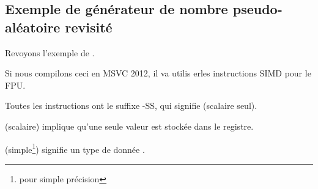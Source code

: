 \subsection{Exemple de générateur de nombre pseudo-aléatoire revisité}
\label{FPU_PRNG_SIMD}

Revoyons l'exemple de  .

Si nous compilons ceci en MSVC 2012, il va utilis erles instructions SIMD pour le
FPU.




Toutes les instructions ont le suffixe -SS, qui signifie  (scalaire seul).

 (scalaire) implique qu'une seule valeur est stockée dans le registre.

 (simple\footnote{pour simple précision}) signifie un type de donnée \Tfloat.

